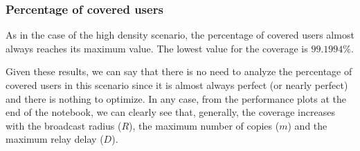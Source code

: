 \subsubsection{Percentage of covered users}\label{subsubsec:ld2krcoverage}

As in the case of the high density scenario, the percentage of covered users
almost always reaches its maximum value. The lowest value for the coverage is
\(99.1994\%\).

Given these results, we can say that there is no need to analyze the percentage
of covered users in this scenario since it is almost always perfect (or nearly
perfect) and there is nothing to optimize. In any case, from the performance
plots at the end of the notebook, we can clearly see that, generally, the
coverage increases with the broadcast radius (\(R\)), the maximum number of
copies (\(m\)) and the maximum relay delay (\(D\)).
